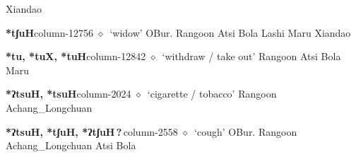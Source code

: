          Xiandao 
  \item {\footnotesize \textbf{*tʃuH}}{\tiny column-12756}
         $\diamond$~`widow'
         OBur. 
\hspace{1ex}
         Rangoon 
\hspace{1ex}
         Atsi 
\hspace{1ex}
         Bola 
\hspace{1ex}
         Lashi 
\hspace{1ex}
         Maru 
\hspace{1ex}
         Xiandao 
  \item {\footnotesize \textbf{*tu, *tuX, *tuH}}{\tiny column-12842}
         $\diamond$~`withdraw / take out'
         Rangoon 
\hspace{1ex}
         Atsi 
\hspace{1ex}
         Bola 
\hspace{1ex}
         Maru 
  \item {\footnotesize \textbf{*ʔtsuH, *tsuH}}{\tiny column-2024}
         $\diamond$~`cigarette / tobacco'
         Rangoon 
\hspace{1ex}
         Achang\_Longchuan 
  \item {\footnotesize \textbf{*ʔtsuH, *tʃuH, *ʔtʃuH\,?\,}}{\tiny column-2558}
         $\diamond$~`cough'
         OBur. 
\hspace{1ex}
         Rangoon 
\hspace{1ex}
         Achang\_Longchuan 
\hspace{1ex}
         Atsi 
\hspace{1ex}
         Bola 
